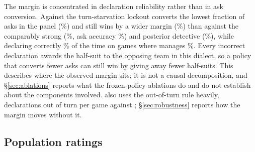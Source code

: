 The margin is concentrated in declaration reliability rather than in ask
conversion. Against the turn-starvation lockout \vfast{} converts the lowest
fraction of asks in the panel (\numVsLockoutAskAcc\%) and still wins by a wider
margin (\numVsLockout\%) than against the comparably strong \vthree{}
(\numVsVthree\%, ask accuracy \numVsVthreeAskAcc\%) and posterior detective
(\numVsDetective\%), while declaring correctly \numVsVthreeDeclAcc\% of the time
on games where \vthree{} manages \numVthreeDeclAccSame\%. Every incorrect
declaration awards the half-suit to the opposing team in this dialect, so a
policy that converts fewer asks can still win by giving away fewer half-suits.
This describes where the observed margin sits; it is not a causal decomposition,
and \S\ref{sec:ablations} reports what the frozen-policy ablations do and do not
establish about the components involved. \vfast{} also uses the out-of-turn rule
heavily, \numVsVthreeOOT{} declarations out of turn per game against \vthree{};
\S\ref{sec:robustness} reports how the margin moves without it.

\subsection{Population ratings}
\label{sec:results-pop}

\begin{table}[!htbp]
\centering
\caption{Bradley--Terry ratings (E4) in Elo with \vthree{} at zero. Population:
the round-robin of Table~\ref{tab:matrix} --- \numMatrixDeals{} deals in six seat
rotations, \numMatrixGamesPair{} games per ordered pair, seed $515151$, nine
policies, all weights frozen. The mean win-rate column averages over the row's
opponents. Ratings are point estimates fitted to the full matrix; no intervals
are constructed for them.}
\label{tab:elo}
\small

\end{table}

\begin{table}[!htbp]
\centering
\caption{Round-robin win rates (E4), row policy against column policy, per cent.
Population: \numMatrixDeals{} deals in all six seat rotations for every ordered
pair, seed $515151$, full rules dialect, all weights frozen. Each cell pools both
orderings, so a cell is \numMatrixGamesCell{} games, \numMatrixGamesPair{} per
ordered pair. Cells are point estimates; no intervals per cell.}
\label{tab:matrix}
\scriptsize
\setlength{\tabcolsep}{3pt}

\end{table}


